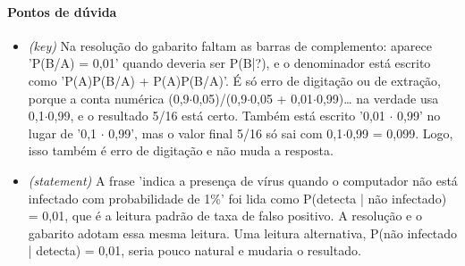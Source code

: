 \documentclass{article}%
\begin{document}
\paragraph{Pontos de dúvida}%
\begin{itemize}%
\item%
\textit{(key)} Na resolução do gabarito faltam as barras de complemento: aparece 'P(B/A) = 0,01' quando deveria ser P(B|?), e o denominador está escrito como 'P(A)P(B/A) + P(A)P(B/A)'. É só erro de digitação ou de extração, porque a conta numérica (0,9$\cdot$0,05)/(0,9$\cdot$0,05 + 0,01$\cdot$0,99)\ldots{} na verdade usa 0,1$\cdot$0,99, e o resultado 5/16 está certo. Também está escrito '0,01 $\cdot$ 0,99' no lugar de '0,1 $\cdot$ 0,99', mas o valor final 5/16 só sai com 0,1$\cdot$0,99 = 0,099. Logo, isso também é erro de digitação e não muda a resposta.%
\item%
\textit{(statement)} A frase 'indica a presença de vírus quando o computador não está infectado com probabilidade de 1\%' foi lida como P(detecta | não infectado) = 0,01, que é a leitura padrão de taxa de falso positivo. A resolução e o gabarito adotam essa mesma leitura. Uma leitura alternativa, P(não infectado | detecta) = 0,01, seria pouco natural e mudaria o resultado.%
\end{itemize}%
\end{document}
